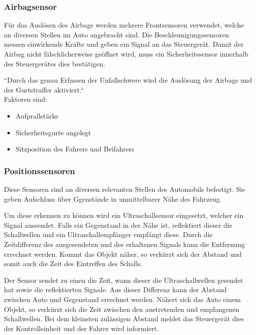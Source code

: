 \begin{flushleft}
	                 \subsubsection{Airbagsensor}
	
	                 Für das Auslösen des Airbags werden mehrere Frontsensoren verwendet, welche an diversen Stellen im Auto angebracht sind. Die Beschleunigungssensoren messen einwirkende Kräfte und geben ein Signal an das Steuergerät.
	                 Damit der Airbag nicht fälschlicherweise geöffnet wird, muss ein Sicherheitssensor innerhalb des Steuergerätes dies bestätigen. 
	                 
	                 ``Durch das genau Erfassen der Unfallschwere wird die Auslösung der Airbags und der Gurtstraffer aktiviert.`` \cite{TS_airbag}\\
	                 Faktoren sind: 
	                 
	                 \begin{itemize}
	                     \item Aufprallstärke
	                     \item Sicherheitsgurte angelegt
	                     \item Sitzposition des Fahrers und Beifahrers
	                 \end{itemize}
	             
	             
	             \subsubsection{Positionssensoren}
	
	                 Diese Sensoren sind an diversen relevanten Stellen des Automobils befestigt. Sie geben Aufschluss über Ggenstände in unmittelbarer Nähe des Fahrzeug.
	
	                 Um diese erkennen zu können wird ein Ultraschallsensor eingesetzt, welcher ein Signal aussendet. Falls ein Gegenstand in der Nähe ist, reflektiert dieser die Schallwellen und ein Ultraschallempfänger empfängt diese. 
	                 Durch die Zeitdifferenz des ausgesendeten und des erhaltenen Signals kann die Entfernung errechnet werden. Kommt das Objekt näher, so verkürzt sich der Abstand und somit auch die Zeit des Eintreffen des Schalls.
	
	                 Der Sensor sendet zu einen die Zeit, wann dieser die Ultraschallwellen gesendet hat sowie die reflektierten Signale. Aus dieser Differenz kann  der Abstand zwischen Auto und Gegenstand errechnet werden. 
	                 Nähert sich das Auto einem Objekt, so verkürzt sich die Zeit zwischen den austretenden und empfangenen Schallwellen. Bei dem kleinsten zulässigen Abstand meldet das Steuergerät dies der Kontrolleinheit und der Fahrer wird informiert.
	

\end{flushleft}
